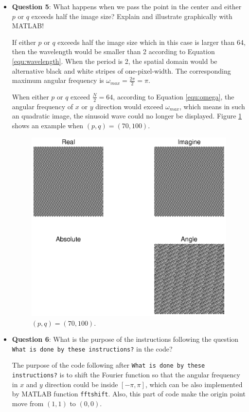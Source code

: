 \documentclass[11pt,a4paper]{article}
\begin{document}
\begin{itemize}
	\item \textbf{Question 5}: What happens when we pass the point in the center and either $p$ or $q$ exceeds half the image size? Explain and illustrate graphically with MATLAB!
	\par If either $p$ or $q$ exceeds half the image size which in this case is larger than 64, then the wavelength would be smaller than 2 according to Equation \ref{equ:wavelength}. When the period is 2, the spatial domain would be alternative black and white stripes of one-pixel-width. The corresponding maximum angular frequency is $\omega_{max} = \frac{2\pi}{2} = \pi$.
	\par When either $p$ or $q$ exceed $\frac{N}{2} = 64$, according to Equation \ref{equ:omega}, the angular frequency of $x$ or $y$ direction would exceed $\omega_{max}$, which means in such an quadratic image, the sinusoid wave could no longer be displayed. Figure \ref{fig:Q5_p_70_q_100} shows an example when $(p, q) = (70, 100)$.
	\begin{figure}[!ht]
		\footnotesize
		\centering
		\includegraphics[width=0.8\columnwidth]{Q5_p_70_q_100.eps}
		\caption{$(p, q) = (70, 100)$.}
		\label{fig:Q5_p_70_q_100}
	\end{figure}

	\item \textbf{Question 6}: What is the purpose of the instructions following the question \texttt{What is done by these instructions?} in the code?
	\par The purpose of the code following after \texttt{What is done by these instructions?} is to shift the Fourier function so that the angular frequency in $x$ and $y$ direction could be inside $\left[-\pi, \pi\right]$, which can be also implemented by MATLAB function \texttt{fftshift}. Also, this part of code make the origin point move from $(1, 1)$ to $(0, 0)$.
\end{itemize}
\end{document}
